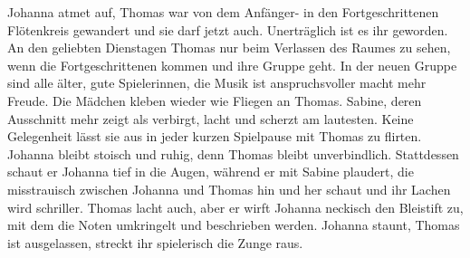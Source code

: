 Johanna atmet auf, Thomas war von dem Anfänger- in den Fortgeschrittenen Flötenkreis gewandert und sie darf jetzt auch. Unerträglich ist es ihr geworden. An den geliebten Dienstagen Thomas nur beim Verlassen des Raumes zu sehen, wenn die Fortgeschrittenen kommen und ihre Gruppe geht.
In der neuen Gruppe sind alle älter, gute Spielerinnen, die Musik ist anspruchsvoller macht mehr Freude. Die Mädchen kleben wieder wie Fliegen an Thomas. Sabine, deren Ausschnitt mehr zeigt als verbirgt, lacht und scherzt am lautesten. Keine Gelegenheit lässt sie aus in jeder kurzen Spielpause mit Thomas zu flirten. Johanna bleibt stoisch und ruhig, denn Thomas bleibt unverbindlich. Stattdessen schaut er Johanna tief in die Augen, während er mit Sabine plaudert, die misstrauisch zwischen Johanna und Thomas hin und her schaut und ihr Lachen wird schriller. Thomas lacht auch, aber er wirft Johanna neckisch den Bleistift zu, mit dem die Noten umkringelt und beschrieben werden. Johanna staunt, Thomas ist ausgelassen, streckt ihr spielerisch die Zunge raus.

